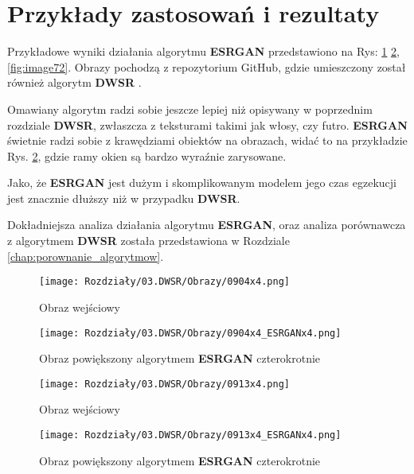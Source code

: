 \section{Przykłady zastosowań i rezultaty}

Przykładowe wyniki działania algorytmu \textbf{ESRGAN} przedstawiono na Rys: \ref{fig:image68} \ref{fig:image70}, \ref{fig:image72}. Obrazy pochodzą z repozytorium GitHub, gdzie umieszczony został również algorytm \textbf{DWSR} \cite{guo2017deep}.

Omawiany algorytm radzi sobie jeszcze lepiej niż opisywany w poprzednim rozdziale \textbf{DWSR}, zwłaszcza z teksturami takimi jak włosy, czy futro. \textbf{ESRGAN} świetnie radzi sobie z krawędziami obiektów na obrazach, widać to na przykładzie Rys. \ref{fig:image70}, gdzie ramy okien są bardzo wyraźnie zarysowane.

Jako, że \textbf{ESRGAN} jest dużym i skomplikowanym modelem jego czas egzekucji jest znacznie dłuższy niż w przypadku \textbf{DWSR}. 

Dokładniejsza analiza działania algorytmu \textbf{ESRGAN}, oraz analiza porównawcza z algorytmem \textbf{DWSR} została przedstawiona w Rozdziale \ref{chap:porownanie_algorytmow}.


\begin{figure}[ht]
    \centering
    \begin{minipage}[t]{0.45\linewidth}
        \texttt{[image: Rozdziały/03.DWSR/Obrazy/0904x4.png]}
        \caption{Obraz wejściowy \cite{guo2017deep}}
        \label{fig:image67}
    \end{minipage}
    \hspace{0.5cm}
    \begin{minipage}[t]{0.45\linewidth}
        \texttt{[image: Rozdziały/03.DWSR/Obrazy/0904x4\_ESRGANx4.png]}
        \caption{Obraz powiększony algorytmem \textbf{ESRGAN} czterokrotnie}
        \label{fig:image68}
    \end{minipage}
\end{figure}

\begin{figure}[ht]
    \centering
    \begin{minipage}[t]{0.45\linewidth}
        \texttt{[image: Rozdziały/03.DWSR/Obrazy/0913x4.png]}
        \caption{Obraz wejściowy \cite{guo2017deep}}
        \label{fig:image69}
    \end{minipage}
    \hspace{0.5cm}
    \begin{minipage}[t]{0.45\linewidth}
        \texttt{[image: Rozdziały/03.DWSR/Obrazy/0913x4\_ESRGANx4.png]}
        \caption{Obraz powiększony algorytmem \textbf{ESRGAN} czterokrotnie}
        \label{fig:image70}
    \end{minipage}
\end{figure}

